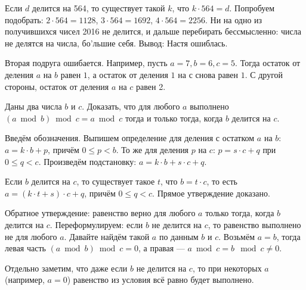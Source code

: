 \begin{itemize}
\itA Если $d$ делится на 564, то существует такой $k$, что $k \cdot 564 = d$. Попробуем подобрать:
$2 \cdot 564 = 1128$, $3 \cdot 564 = 1692$, $4 \cdot 564 = 2256$. Ни на одно из получившихся чисел
2016 не делится, и дальше перебирать бессмысленно: числа не делятся на числа, бо'льшие себя.
Вывод: Настя ошиблась.

\itB Вторая подруга ошибается. Например, пусть $a = 7, b = 6, c = 5$. Тогда остаток от деления
$a$ на $b$ равен $1$, а остаток от деления $1$ на $с$ снова равен $1$. С другой стороны, остаток
от деления $a$ на $c$ равен 2.

\itC Даны два числа $b$ и $c$. Доказать, что для любого $a$ выполнено 
$(a \bmod b) \bmod c = a \bmod c$ тогда и только тогда, когда $b$ делится на $c$.

Введём обозначения.
Выпишем определение для деления с остатком $a$ на $b$: $a = k \cdot b + p$, причём $0 \le p < b$.
То же для деления $p$ на $c$: $p = s \cdot c + q$ при $0 \le q < c$. 
Произведём подстановку: $a = k \cdot b + s \cdot c + q$. 

Если $b$ делится на $c$, то существует
такое $t$, что $b = t\cdot c$, то есть $a = (k \cdot t + s) \cdot c + q$, причём $0 \le q < c$.
Прямое утверждение доказано.

Обратное утверждение: равенство верно для любого $a$ только тогда, когда $b$ делится на $c$. 
Переформулируем: если $b$ не делится на $c$, то равенство выполнено не для любого $a$.
Давайте найдём такой $a$ по данным $b$ и $c$.
Возьмём $a = b$, тогда левая часть $(a \bmod b) \bmod c = 0$,
а правая --- $a \bmod c = b \mod c \ne 0$.

Отдельно заметим, что даже если $b$ не делится на $c$, то при некоторых $a$ (например, $a = 0$)
равенство из условия всё равно будет выполнено.

\end{itemize}

